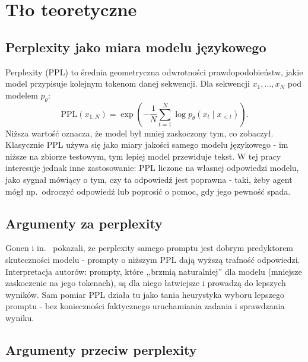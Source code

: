 
\section{Tło teoretyczne}
\label{sec:tlo}

\subsection{Perplexity jako miara modelu językowego}
\label{sec:perplexity-def}

Perplexity (PPL) to średnia geometryczna odwrotności prawdopodobieństw,
jakie model przypisuje kolejnym tokenom danej sekwencji. Dla
sekwencji $x_1, \dots, x_N$ pod modelem $p_\theta$:
\begin{equation}
\mathrm{PPL}(x_{1:N}) = \exp\!\left(-\frac{1}{N} \sum_{t=1}^{N} \log p_\theta(x_t \mid x_{<t})\right).
\label{eq:ppl}
\end{equation}
Niższa wartość oznacza, że model był mniej zaskoczony tym, co
zobaczył. Klasycznie PPL używa się jako miary jakości samego
modelu językowego - im niższe na zbiorze testowym, tym lepiej
model przewiduje tekst. W tej pracy interesuje jednak inne
zastosowanie: PPL liczone na własnej odpowiedzi modelu, jako
sygnał mówiący o tym, czy ta odpowiedź jest poprawna - taki,
żeby agent mógł np.\ odroczyć odpowiedź lub poprosić o pomoc,
gdy jego pewność spada.

\subsection{Argumenty za perplexity}
\label{sec:pro-ppl}

Gonen i in.~\cite{gonen2023demystifying} pokazali, że perplexity
samego promptu jest dobrym predyktorem skuteczności modelu - prompty
o niższym PPL dają wyższą trafność odpowiedzi. Interpretacja
autorów: prompty, które ,,brzmią naturalniej'' dla modelu (mniejsze
zaskoczenie na jego tokenach), są dla niego łatwiejsze i prowadzą
do lepszych wyników. Sam pomiar PPL działa tu jako tania heurystyka
wyboru lepszego promptu - bez konieczności faktycznego uruchamiania
zadania i sprawdzania wyniku.

\subsection{Argumenty przeciw perplexity}
\label{sec:anti-ppl}


